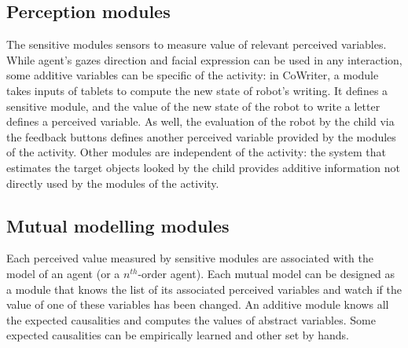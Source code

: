\documentclass[conference]{IEEEtran}
\begin{document}
\subsection{Perception modules}
\label{ssec:perception}
The sensitive modules sensors to measure value of relevant perceived variables. While agent's gazes direction and facial expression can be used in any interaction, some additive variables can be specific of the activity: in CoWriter, a module takes inputs of tablets to compute the new state of robot's writing. It defines a sensitive module, and the value of the new state of the robot to write a letter defines a perceived variable. As well, the evaluation of the robot by the child via the feedback buttons defines another perceived variable provided by the modules of the activity. Other modules are independent of the activity: the system that estimates the target objects looked by the child provides additive information not directly used by the modules of the activity.  

\subsection{Mutual modelling modules}
\label{ssec:mmm}
Each perceived value measured by sensitive modules are associated with the model of an agent (or a $n^{th}$-order agent). Each mutual model can be designed as a module that knows the list of its associated perceived variables and watch if the value of one of these variables has been changed. 
An additive module knows all the expected causalities and computes the values of abstract variables. Some expected causalities can be empirically learned and other set by hands. 
\end{document}
